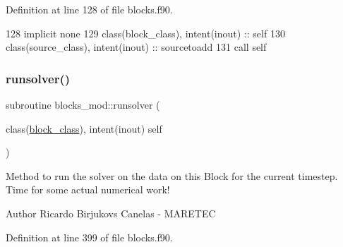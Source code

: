 Definition at line 128 of file blocks.\+f90.


\begin{DoxyCode}
128     \textcolor{keywordtype}{implicit none}
129     \textcolor{keywordtype}{class}(block\_class), \textcolor{keywordtype}{intent(inout)} :: self
130     \textcolor{keywordtype}{class}(source\_class), \textcolor{keywordtype}{intent(inout)} :: sourcetoadd
131     \textcolor{keyword}{call }self%
\end{DoxyCode}
\mbox{\label{namespaceblocks__mod_a3245bdadbec6bb123c517921d1503b48}} 
\subsubsection{\texorpdfstring{runsolver()}{runsolver()}}
{\footnotesize\ttfamily subroutine blocks\+\_\+mod\+::runsolver (\begin{DoxyParamCaption}\item[{class(\mbox{\hyperlink{structblocks__mod_1_1block__class}{block\+\_\+class}}), intent(inout)}]{self }\end{DoxyParamCaption})\hspace{0.3cm}{\ttfamily [private]}}



Method to run the solver on the data on this Block for the current timestep. Time for some actual numerical work! 

\begin{DoxyAuthor}{Author}
Ricardo Birjukovs Canelas -\/ M\+A\+R\+E\+T\+EC 
\end{DoxyAuthor}


Definition at line 399 of file blocks.\+f90.


\mbox{\label{namespaceblocks__mod_a1e632738786730731a48d9a432f6ab84}} 
